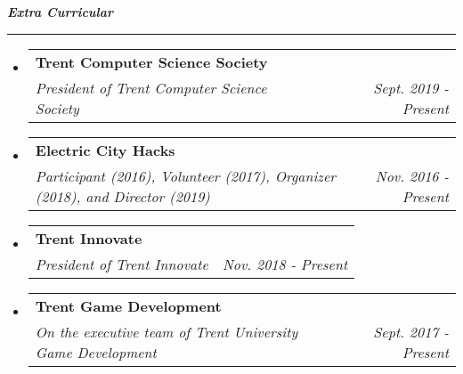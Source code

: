 \documentclass[letterpaper,11pt]{article}
\makeatletter
\newcommand{\resitem}[1]{\item #1 \vspace{-2pt}}
\newcommand{\mysection}[1]{\vspace{5pt} {\bfseries \textsl{#1}} \\ {\color{gray} \rule[5pt]{\textwidth}{1pt}}}
\newcommand{\ressubheading}[4]{\begin{tabular*}{6.5in}{l@{\extracolsep{\fill}}r}
        \textbf{#1} & #2 \\
        \textit{#3} & \textit{#4} \\
\end{tabular*}\vspace{-6pt}}
\makeatother
\begin{document}
\mysection{Extra Curricular}
\begin{itemize}
    \item
        \ressubheading{Trent Computer Science Society}{}{President of Trent
        Computer Science Society}{Sept. 2019 - Present}
    \item
        \ressubheading{Electric City Hacks}{}{Participant (2016), Volunteer
            (2017), Organizer (2018), and Director (2019)}{Nov. 2016 - Present}
    \item
        \ressubheading{Trent Innovate}{}{President of Trent Innovate}{Nov. 2018 - Present}
    \item
        \ressubheading{Trent Game Development}{}{On the executive team of
        Trent University Game Development}{Sept. 2017 - Present}
\end{itemize}
\end{document}
